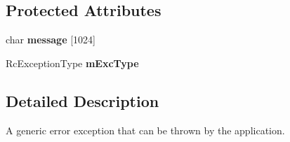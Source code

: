 \subsection*{Protected Attributes}
\begin{DoxyCompactItemize}
\item 
\hypertarget{classroboctrl_1_1_rc_exception_ac043987b2f9a26cef2fe73645865dd03}{char {\bfseries message} \mbox{[}1024\mbox{]}}\label{classroboctrl_1_1_rc_exception_ac043987b2f9a26cef2fe73645865dd03}

\item 
\hypertarget{classroboctrl_1_1_rc_exception_adfc432aa2f96f6bced31606505ee8a8d}{Rc\-Exception\-Type {\bfseries m\-Exc\-Type}}\label{classroboctrl_1_1_rc_exception_adfc432aa2f96f6bced31606505ee8a8d}

\end{DoxyCompactItemize}


\subsection{Detailed Description}
A generic error exception that can be thrown by the application. 

